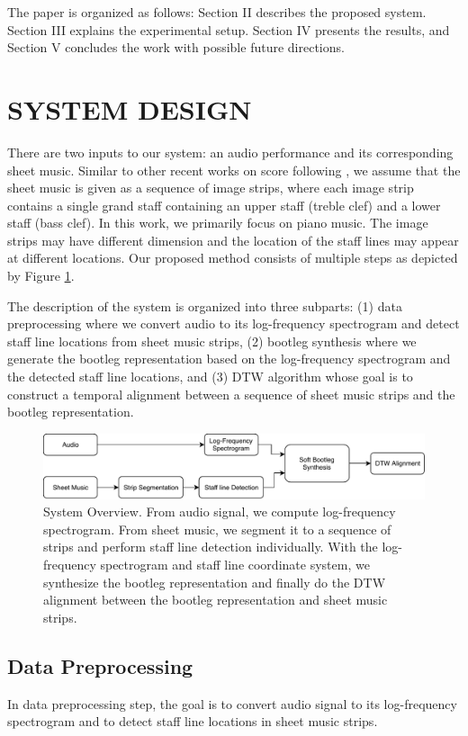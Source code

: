 \documentclass[letterpaper, 10pt, conference]{ieeeconf}  %
\begin{document}
The paper is organized as follows: Section II describes the proposed system. Section III explains the experimental setup. Section IV presents the results, and Section V concludes the work with possible future directions.

\section{SYSTEM DESIGN}
There are two inputs to our system: an audio performance and its corresponding sheet music. Similar to other recent works on score following \cite{dorfer, dorfer2, dorfer3}, we assume that the sheet music is given as a sequence of image strips, where each image strip contains a single grand staff containing an upper staff (treble clef) and a lower staff (bass clef). In this work, we primarily focus on piano music. The image strips may have different dimension and the location of the staff lines may appear at different locations. Our proposed method consists of multiple steps as depicted by Figure \ref{fig:system_overview}. 

The description of the system is organized into three subparts: (1) data preprocessing where we convert audio to its log-frequency spectrogram and detect staff line locations from sheet music strips, (2) bootleg synthesis where we generate the bootleg representation based on the log-frequency spectrogram and the detected staff line locations, and (3) DTW algorithm whose goal is to construct a temporal alignment between a sequence of sheet music strips and the bootleg representation.

\begin{figure}
    \centering
    \includegraphics[width=\textwidth]{images/SystemOverview.pdf}
    \caption{System Overview. From audio signal, we compute log-frequency spectrogram. From sheet music, we segment it to a sequence of strips and perform staff line detection individually. With the log-frequency spectrogram and staff line coordinate system, we synthesize the bootleg representation and finally do the DTW alignment between the bootleg representation and sheet music strips.}
    \label{fig:system_overview}
\end{figure}

\subsection{Data Preprocessing}
In data preprocessing step, the goal is to convert audio signal to its log-frequency spectrogram and to detect staff line locations in sheet music strips.
\end{document}
